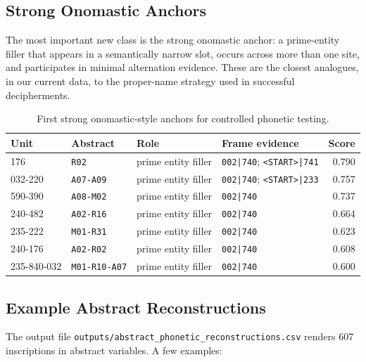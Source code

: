 \subsection{Strong Onomastic Anchors}

The most important new class is the strong onomastic anchor: a prime-entity filler that appears in a semantically narrow slot, occurs across more than one site, and participates in minimal alternation evidence. These are the closest analogues, in our current data, to the proper-name strategy used in successful decipherments.

\begin{table}[htbp]
\centering
\footnotesize
\begin{tabular}{llllr}
\toprule
\textbf{Unit} & \textbf{Abstract} & \textbf{Role} & \textbf{Frame evidence} & \textbf{Score} \\
\midrule
176 & \texttt{R02} & prime entity filler & \texttt{002|740}; \texttt{<START>|741} & 0.790 \\
032-220 & \texttt{A07-A09} & prime entity filler & \texttt{002|740}; \texttt{<START>|233} & 0.757 \\
590-390 & \texttt{A08-M02} & prime entity filler & \texttt{002|740} & 0.737 \\
240-482 & \texttt{A02-R16} & prime entity filler & \texttt{002|740} & 0.664 \\
235-222 & \texttt{M01-R31} & prime entity filler & \texttt{002|740} & 0.623 \\
240-176 & \texttt{A02-R02} & prime entity filler & \texttt{002|740} & 0.608 \\
235-840-032 & \texttt{M01-R10-A07} & prime entity filler & \texttt{002|740} & 0.600 \\
\bottomrule
\end{tabular}
\caption{First strong onomastic-style anchors for controlled phonetic testing.}
\label{tab:strong-onomastic-anchors}
\end{table}

\subsection{Example Abstract Reconstructions}

The output file \texttt{outputs/abstract\_phonetic\_reconstructions.csv} renders 607 inscriptions in abstract variables. A few examples:

